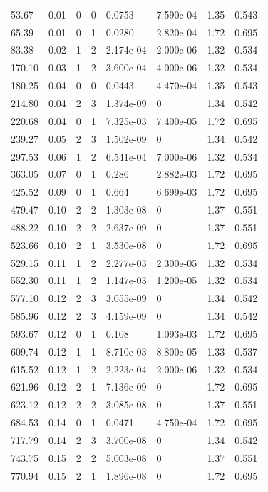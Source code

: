 \documentclass[preview]{standalone}
\begin{document}
{{\begin{tabular}{L{1.2cm}C{1.2cm} C{0.3cm}C{0.5cm} C{1.4cm}C{1.4cm} C{1.4cm}C{1.4cm}}
  53.67  &  0.01  & 0     &  0 &  0.0753  & 7.590e-04  & 1.35 &  0.543   \\ 
  65.39  &  0.01  & 0     &  1 &  0.0280  & 2.820e-04  & 1.72 &  0.695   \\ 
  83.38  &  0.02  & 1     &  2 &  2.174e-04  & 2.000e-06  & 1.32 &  0.534   \\ 
  170.10  &  0.03  & 1     &  2 &  3.600e-04  & 4.000e-06  & 1.32 &  0.534   \\ 
  180.25  &  0.04  & 0     &  0 &  0.0443  & 4.470e-04  & 1.35 &  0.543   \\ 
  214.80  &  0.04  & 2     &  3 &  1.374e-09  & 0  & 1.34 &  0.542   \\ 
  220.68  &  0.04  & 0     &  1 &  7.325e-03  & 7.400e-05  & 1.72 &  0.695   \\ 
  239.27  &  0.05  & 2     &  3 &  1.502e-09  & 0  & 1.34 &  0.542   \\ 
  297.53  &  0.06  & 1     &  2 &  6.541e-04  & 7.000e-06  & 1.32 &  0.534   \\ 
  363.05  &  0.07  & 0     &  1 &  0.286  & 2.882e-03  & 1.72 &  0.695   \\ 
  425.52  &  0.09  & 0     &  1 &  0.664  & 6.699e-03  & 1.72 &  0.695   \\ 
  479.47  &  0.10  & 2     &  2 &  1.303e-08  & 0  & 1.37 &  0.551   \\ 
  488.22  &  0.10  & 2     &  2 &  2.637e-09  & 0  & 1.37 &  0.551   \\ 
  523.66  &  0.10  & 2     &  1 &  3.530e-08  & 0  & 1.72 &  0.695   \\ 
  529.15  &  0.11  & 1     &  2 &  2.277e-03  & 2.300e-05  & 1.32 &  0.534   \\ 
  552.30  &  0.11  & 1     &  2 &  1.147e-03  & 1.200e-05  & 1.32 &  0.534   \\ 
  577.10  &  0.12  & 2     &  3 &  3.055e-09  & 0  & 1.34 &  0.542   \\ 
  585.96  &  0.12  & 2     &  3 &  4.159e-09  & 0  & 1.34 &  0.542   \\ 
  593.67  &  0.12  & 0     &  1 &  0.108  & 1.093e-03  & 1.72 &  0.695   \\ 
  609.74  &  0.12  & 1     &  1 &  8.710e-03  & 8.800e-05  & 1.33 &  0.537   \\ 
  615.52  &  0.12  & 1     &  2 &  2.223e-04  & 2.000e-06  & 1.32 &  0.534   \\ 
  621.96  &  0.12  & 2     &  1 &  7.136e-09  & 0  & 1.72 &  0.695   \\ 
  623.12  &  0.12  & 2     &  2 &  3.085e-08  & 0  & 1.37 &  0.551   \\ 
  684.53  &  0.14  & 0     &  1 &  0.0471  & 4.750e-04  & 1.72 &  0.695   \\ 
  717.79  &  0.14  & 2     &  3 &  3.700e-08  & 0  & 1.34 &  0.542   \\ 
  743.75  &  0.15  & 2     &  2 &  5.003e-08  & 0  & 1.37 &  0.551   \\ 
  770.94  &  0.15  & 2     &  1 &  1.896e-08  & 0  & 1.72 &  0.695   \\ 
\hline 
\end{tabular} 

}}
\end{document}
